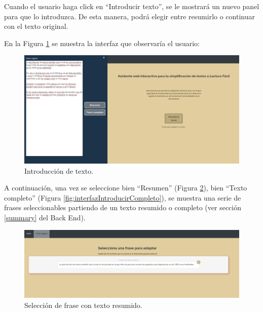 Cuando el usuario haga click en ``Introducir texto'', se le mostrará un nuevo panel para que lo introduzca. De esta manera, podrá elegir entre resumirlo o continuar con el texto original.


En la Figura \ref{fig:interfazIntroduccionTexto} se muestra la interfaz que observaría el usuario:

\begin{figure}[h!]
	\centering
	
	
	\includegraphics[scale=0.4]{Imagenes/Figuras/InterfazPanelIntroducirTexto}


\caption{Introducción de texto.}
\label{fig:interfazIntroduccionTexto}
\end{figure}

	
A continuación, una vez se seleccione bien ``Resumen'' (Figura \ref{fig:interfazFraseTextoResumido}), bien ``Texto completo'' (Figura \ref{fig:interfazIntroducirCompleto}), se muestra una serie de frases seleccionables partiendo de un texto resumido o completo (ver sección \ref{summary} del Back End). 


\begin{figure}[h!]
	\centering
	
	
	\includegraphics[scale=0.4]{Imagenes/Figuras/FrasesTextoResumido}
	
	
	\caption{Selección de frase con texto resumido.}
	\label{fig:interfazFraseTextoResumido}
\end{figure}


